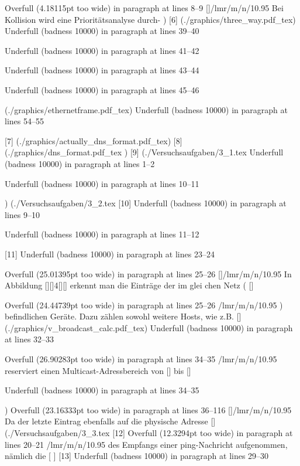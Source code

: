 Overfull \hbox (4.18115pt too wide) in paragraph at lines 8--9
[]\TU/lmr/m/n/10.95 Bei Kollision wird eine Prioritätsanalyse durch-
) [6] (./graphics/three_way.pdf_tex)
Underfull \hbox (badness 10000) in paragraph at lines 39--40


Underfull \hbox (badness 10000) in paragraph at lines 41--42


Underfull \hbox (badness 10000) in paragraph at lines 43--44


Underfull \hbox (badness 10000) in paragraph at lines 45--46

(./graphics/ethernetframe.pdf_tex)
Underfull \hbox (badness 10000) in paragraph at lines 54--55

[7] (./graphics/actually_dns_format.pdf_tex) [8] (./graphics/dns_format.pdf_tex
) [9] (./Versuchsaufgaben/3_1.tex
Underfull \hbox (badness 10000) in paragraph at lines 1--2


Underfull \hbox (badness 10000) in paragraph at lines 10--11

) (./Versuchsaufgaben/3_2.tex [10]
Underfull \hbox (badness 10000) in paragraph at lines 9--10


Underfull \hbox (badness 10000) in paragraph at lines 11--12

[11]
Underfull \hbox (badness 10000) in paragraph at lines 23--24


Overfull \hbox (25.01395pt too wide) in paragraph at lines 25--26
[]\TU/lmr/m/n/10.95 In Abbildung [][]4[][] erkennt man die Einträge der im glei
chen Netz ( []

Overfull \hbox (24.44739pt too wide) in paragraph at lines 25--26
\TU/lmr/m/n/10.95 ) befindlichen Geräte. Dazu zählen sowohl weitere Hosts, wie 
z.B.  []
(./graphics/v_broadcast_calc.pdf_tex)
Underfull \hbox (badness 10000) in paragraph at lines 32--33


Overfull \hbox (26.90283pt too wide) in paragraph at lines 34--35
\TU/lmr/m/n/10.95 reserviert einen Multicast-Adressbereich von  []  bis  []

Underfull \hbox (badness 10000) in paragraph at lines 34--35

)
Overfull \hbox (23.16333pt too wide) in paragraph at lines 36--116
[]\TU/lmr/m/n/10.95 Da der letzte Eintrag ebenfalls auf die physische Adresse  
[]
(./Versuchsaufgaben/3_3.tex [12]
Overfull \hbox (12.3294pt too wide) in paragraph at lines 20--21
\TU/lmr/m/n/10.95 des Empfangs einer ping-Nachricht aufgenommen, nämlich die  [
]
[13]
Underfull \hbox (badness 10000) in paragraph at lines 29--30


